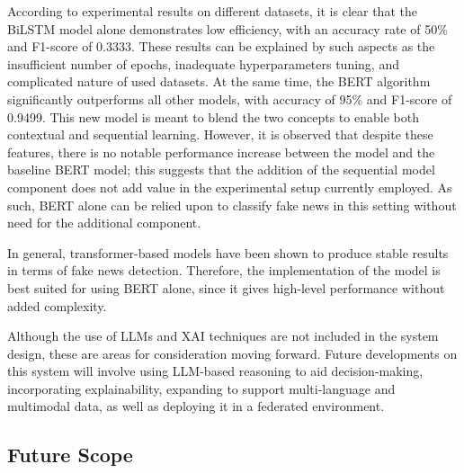 \documentclass[runningheads]{llncs}
\begin{document}
According to experimental results on different datasets, it is clear that the BiLSTM model alone demonstrates low efficiency, with an accuracy rate of 50\% and F1-score of 0.3333. These results can be explained by such aspects as the insufficient number of epochs, inadequate hyperparameters tuning, and complicated nature of used datasets. At the same time, the BERT algorithm significantly outperforms all other models, with accuracy of 95\% and F1-score of 0.9499.
This new model is meant to blend the two concepts to enable both contextual and sequential learning. However, it is observed that despite these features, there is no notable performance increase between the model and the baseline BERT model; this suggests that the addition of the sequential model component does not add value in the experimental setup currently employed. As such, BERT alone can be relied upon to classify fake news in this setting without need for the additional component.

In general, transformer-based models have been shown to produce stable results in terms of fake news detection. Therefore, the implementation of the model is best suited for using BERT alone, since it gives high-level performance without added complexity.

Although the use of LLMs and XAI techniques are not included in the system design, these are areas for consideration moving forward. Future developments on this system will involve using LLM-based reasoning to aid decision-making, incorporating explainability, expanding to support multi-language and multimodal data, as well as deploying it in a federated environment.

\subsection{Future Scope}
\end{document}
